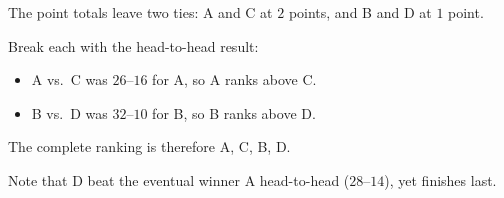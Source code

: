\documentclass[12pt]{ximera}
\begin{document}
\begin{problem}
\begin{prompt}
\begin{feedback}
The point totals leave two ties: A and C at $2$ points, and B and D at $1$ point.

Break each with the head-to-head result:
\begin{itemize}
\item A vs.\ C was $26$--$16$ for A, so A ranks above C.
\item B vs.\ D was $32$--$10$ for B, so B ranks above D.
\end{itemize}
The complete ranking is therefore A, C, B, D.

Note that D beat the eventual winner A head-to-head ($28$--$14$), yet finishes last.
\end{feedback}
\end{prompt}
\end{problem}
\end{document}
